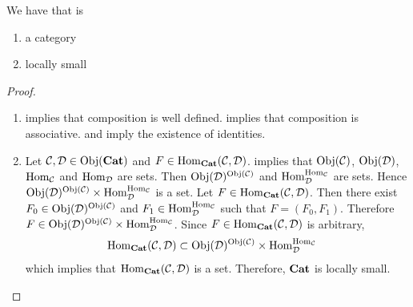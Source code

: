 \documentclass{book}
\begin{document}
	\begin{ex} 
		We have that  is 
		\begin{enumerate}
			\item a category
			\item locally small
		\end{enumerate} 
	\end{ex}

	\begin{proof}\
		\begin{enumerate}
			\item {} implies that composition is well defined.  implies that composition is associative.  and  imply the existence of identities.
			\item Let $\MC, \MD \in \Obj(\tbf{Cat})$ and $F \in \Hom_{\tbf{Cat}}(\MC, \MD)$. \rd{12002} implies that $\Obj(\MC)$, $\Obj(\MD)$, $\Hom_{\MC}$ and $\Hom_{\MD}$ are sets. Then $\Obj(\MD)^{\Obj(\MC)}$ and $\Hom_{\MD}^{ \Hom_{\MC}}$ are sets. Hence $ \Obj(\MD)^{\Obj(\MC)} \times  \Hom_{\MD}^{ \Hom_{\MC}}$ is a set. Let $F \in \Hom_{\tbf{Cat}}(\MC, \MD)$. Then there exist $F_0 \in \Obj(\MD)^{\Obj(\MC)} $ and $F_1 \in \Hom_{\MD}^{ \Hom_{\MC}}$ such that $F = (F_0, F_1)$. Therefore $F \in  \Obj(\MD)^{\Obj(\MC)} \times  \Hom_{\MD}^{ \Hom_{\MC}}$. Since $F \in \Hom_{\tbf{Cat}}(\MC, \MD)$ is arbitrary, 
			\begin{align*}
				\Hom_{\tbf{Cat}}(\MC, \MD) 
				& \subset \Obj(\MD)^{\Obj(\MC)} \times  \Hom_{\MD}^{ \Hom_{\MC}}
			\end{align*}
			which implies that $\Hom_{\tbf{Cat}}(\MC, \MD)$ is a set. Therefore, $\tbf{Cat}$ is locally small.
		\end{enumerate} 
	\end{proof}
	
	
	
	
	
	
	
	
	
	
	
	
	
	
	
	
	
	
	
	
	
	
	
	
	
	
	
	
	
\end{document}
